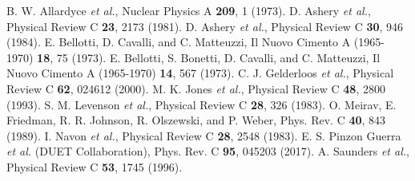 \documentclass[12pt]{article}
\begin{document}
%

\begin{thebibliography}{12}

B. W. Allardyce \textit{et al.}, Nuclear Physics A \textbf{209}, 1 (1973).
D. Ashery \textit{et al.}, Physical Review C \textbf{23}, 2173 (1981).
D. Ashery \textit{et al.}, Physical Review C \textbf{30}, 946 (1984).
E. Bellotti, D. Cavalli, and C. Matteuzzi, Il Nuovo Cimento A (1965-1970) \textbf{18}, 75 (1973).
E. Bellotti, S. Bonetti, D. Cavalli, and C. Matteuzzi, Il
Nuovo Cimento A (1965-1970) \textbf{14}, 567 (1973).
C. J. Gelderloos \textit{et al.}, Physical Review C \textbf{62}, 024612
(2000).
M. K. Jones \textit{et al.}, Physical Review C \textbf{48}, 2800 (1993).
S. M. Levenson \textit{et al.}, Physical Review C \textbf{28}, 326 (1983).
O. Meirav, E. Friedman, R. R. Johnson, R. Olszewski,
and P. Weber, Phys. Rev. C \textbf{40}, 843 (1989).
I. Navon \textit{et al.}, Physical Review C \textbf{28}, 2548 (1983).
E. S. Pinzon Guerra \textit{et al.} (DUET Collaboration), Phys.
Rev. C \textbf{95}, 045203 (2017).
A. Saunders \textit{et al.}, Physical Review C \textbf{53}, 1745 (1996).
\end{thebibliography}
\end{document}
